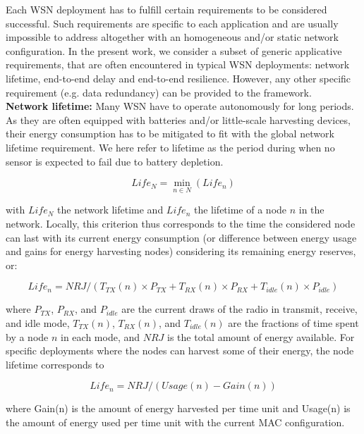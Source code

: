 \documentclass[12pt,journal,compsoc]{IEEEtran}
\begin{document}
Each WSN deployment has to fulfill certain requirements to be considered successful. Such requirements are specific to each application and are usually impossible to address altogether with an homogeneous and/or static network configuration.
In the present work, we consider a subset of generic applicative requirements, that are often encountered in typical WSN deployments: network lifetime, end-to-end delay and end-to-end resilience. However, any other specific requirement (e.g. data redundancy) can be provided to the framework.\\

\textbf{Network lifetime:} Many WSN have to operate autonomously for long periods. As they are often equipped with batteries and/or little-scale harvesting devices, their energy consumption has to be mitigated to fit with the global network lifetime requirement. We here refer to lifetime as the period during when no sensor is expected to fail due to battery depletion.

\begin{small}
\[
Life_{N} = \min_{n \in N} (Life_{n})
\]
\end{small}

with $Life_{N}$ the network lifetime and $Life_{n}$ the lifetime of a node $n$ in the network. Locally, this criterion thus corresponds to the time the considered node can last with its current energy consumption (or difference between energy usage and gains for energy harvesting nodes) considering its remaining energy reserves, or:

\begin{small}
\[
Life_{n} = NRJ / (T_{TX}(n) \times P_{TX} + T_{RX}(n) \times P_{RX} + T_{idle}(n) \times P_{idle})
\]
\end{small}

where $P_{TX}$, $P_{RX}$, and $P_{idle}$ are the current draws of the radio in transmit, receive, and idle mode, $T_{TX}(n)$, $T_{RX}(n)$, and $T_{idle}(n)$ are the fractions of time spent by a node $n$ in each mode, and $NRJ$ is the total amount of energy available. For specific deployments where the nodes can harvest some of their energy, the node lifetime corresponds to \\

\begin{small}
\[
Life_{n} = NRJ / (Usage(n) - Gain(n))
\]
\end{small}

where Gain(n) is the amount of energy harvested per time unit and Usage(n) is the amount of energy used per time unit with the current MAC configuration.\\
\end{document}
